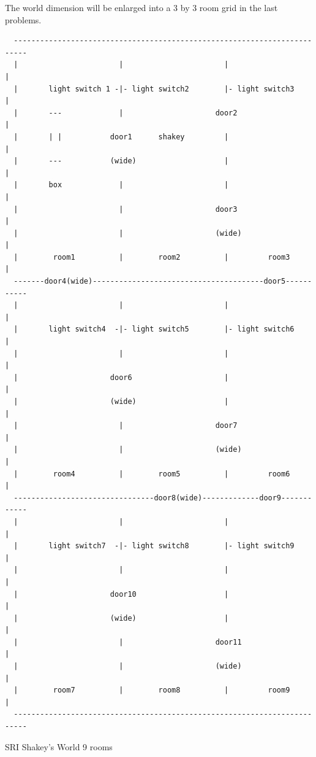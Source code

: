 \newpage
The world dimension will be enlarged into a 3 by 3 room grid in the last
problems.
\thispagestyle{empty}
\begin{center}
  \begin{verbatim}
  -------------------------------------------------------------------------
  |                       |                       |                       |
  |       light switch 1 -|- light switch2        |- light switch3        |
  |       ---             |                     door2                     |
  |       | |           door1      shakey         |                       |
  |       ---           (wide)                    |                       |
  |       box             |                       |                       |
  |                       |                     door3                     |
  |                       |                     (wide)                    |
  |        room1          |        room2          |         room3         |
  -------door4(wide)---------------------------------------door5-----------
  |                       |                       |                       |
  |       light switch4  -|- light switch5        |- light switch6        |
  |                       |                       |                       |
  |                     door6                     |                       |
  |                     (wide)                    |                       |
  |                       |                     door7                     |
  |                       |                     (wide)                    |
  |        room4          |        room5          |         room6         |
  --------------------------------door8(wide)-------------door9------------
  |                       |                       |                       |
  |       light switch7  -|- light switch8        |- light switch9        |
  |                       |                       |                       |
  |                     door10                    |                       |
  |                     (wide)                    |                       |
  |                       |                     door11                    |
  |                       |                     (wide)                    |
  |        room7          |        room8          |         room9         |
  -------------------------------------------------------------------------
  \end{verbatim}
  SRI Shakey's World 9 rooms
\end{center}

